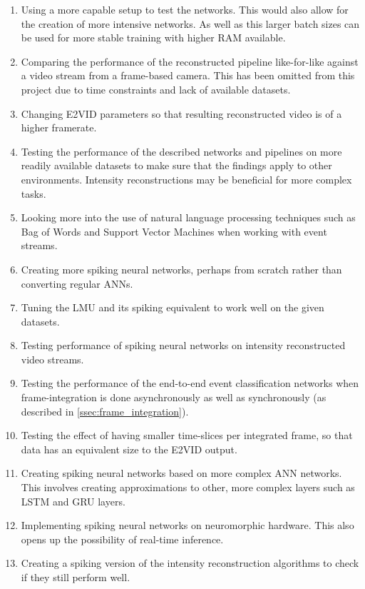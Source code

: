 \begin{enumerate}
    \item Using a more capable setup to test the networks. This would also allow for the creation of more intensive networks. As well as this larger batch sizes can be used for more stable training with higher RAM available.
    \item Comparing the performance of the reconstructed pipeline like-for-like against a video stream from a frame-based camera. This has been omitted from this project due to time constraints and lack of available datasets.
    \item Changing E2VID parameters so that resulting reconstructed video is of a higher framerate.
    \item Testing the performance of the described networks and pipelines on more readily available datasets to make sure that the findings apply to other environments. Intensity reconstructions may be beneficial for more complex tasks.
    \item Looking more into the use of natural language processing techniques such as Bag of Words and Support Vector Machines when working with event streams.
    \item Creating more spiking neural networks, perhaps from scratch rather than converting regular ANNs.
    \item Tuning the LMU and its spiking equivalent to work well on the given datasets.
    \item Testing performance of spiking neural networks on intensity reconstructed video streams.
    \item Testing the performance of the end-to-end event classification networks when frame-integration is done asynchronously as well as synchronously (as described in \cref{ssec:frame_integration}). 
    \item Testing the effect of having smaller time-slices per integrated frame, so that data has an equivalent size to the E2VID output.
    \item Creating spiking neural networks based on more complex ANN networks. This involves creating approximations to other, more complex layers such as LSTM and GRU layers.
    \item Implementing spiking neural networks on neuromorphic hardware. This also opens up the possibility of real-time inference.
    \item Creating a spiking version of the intensity reconstruction algorithms to check if they still perform well.
\end{enumerate}

